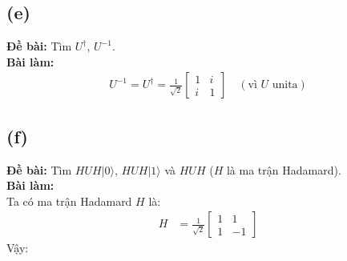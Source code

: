 \subsection{(e)}
\textbf{Đề bài:} Tìm $U^{\dagger}$, $U^{-1}$.\\
\textbf{Bài làm:}
\begin{align*}
    U^{-1} = U^\dagger = \frac{1}{\sqrt{2}}\begin{bmatrix}
                                               1 & i \\
                                               i & 1
                                           \end{bmatrix} \quad (\text{vì $U$ unita})
\end{align*}

\subsection{(f)}
\textbf{Đề bài:} Tìm $HUH|0\rangle$, $HUH|1\rangle$ và $HUH$ ($H$ là ma trận Hadamard).\\
\textbf{Bài làm:}\\
Ta có ma trận Hadamard $H$ là:
\begin{align*}
    H & = \frac{1}{\sqrt{2}}\begin{bmatrix}
                                1 & 1  \\
                                1 & -1
                            \end{bmatrix}
\end{align*}
Vậy:
